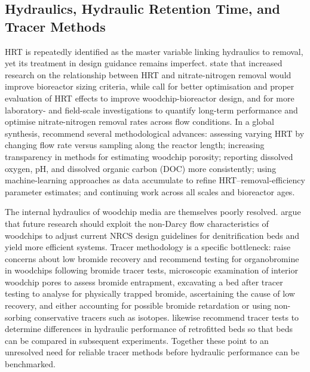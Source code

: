 \subsection{Hydraulics, Hydraulic Retention Time, and Tracer Methods}
HRT is repeatedly identified as the master variable linking hydraulics to removal, yet its treatment in design guidance remains imperfect. \textcite{Moorman2015} state that increased research on the relationship between HRT and nitrate-nitrogen removal would improve bioreactor sizing criteria, while \textcite{Povilaitis2018} call for better optimisation and proper evaluation of HRT effects to improve woodchip-bioreactor design, and for more laboratory- and field-scale investigations to quantify long-term performance and optimise nitrate-nitrogen removal rates across flow conditions. In a global synthesis, \textcite{Christianson2025c} recommend several methodological advances: assessing varying HRT by changing flow rate versus sampling along the reactor length; increasing transparency in methods for estimating woodchip porosity; reporting dissolved oxygen, pH, and dissolved organic carbon (DOC) more consistently; using machine-learning approaches as data accumulate to refine HRT--removal-efficiency parameter estimates; and continuing work across all scales and bioreactor ages.

The internal hydraulics of woodchip media are themselves poorly resolved. \textcite{Ghane2016} argue that future research should exploit the non-Darcy flow characteristics of woodchips to adjust current NRCS design guidelines for denitrification beds and yield more efficient systems. Tracer methodology is a specific bottleneck: \textcite{Ghane2019b} raise concerns about low bromide recovery and recommend testing for organobromine in woodchips following bromide tracer tests, microscopic examination of interior woodchip pores to assess bromide entrapment, excavating a bed after tracer testing to analyse for physically trapped bromide, ascertaining the cause of low recovery, and either accounting for possible bromide retardation or using non-sorbing conservative tracers such as isotopes. \textcite{Ghane2018} likewise recommend tracer tests to determine differences in hydraulic performance of retrofitted beds so that beds can be compared in subsequent experiments. Together these point to an unresolved need for reliable tracer methods before hydraulic performance can be benchmarked.


